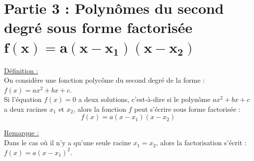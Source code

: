 \documentclass[12pt]{article}
\newcommand{\Pointilles}[2][3]{%
  \par\nobreak
  \noindent\rule{0pt}{1.5\baselineskip}%
  \multido{}{#2}{\noindent\makebox[\linewidth]{\rule{0pt}{#1\baselineskip}\dotfill}\endgraf}%
  \bigskip%
}
\begin{document}
\begin{mdframed}[
    linewidth=1pt,
    roundcorner=5pt,
    linecolor=blue
]
\begin{minipage}{.4\textwidth}
    \end{minipage}%
    \hfill
    \begin{minipage}{.6\textwidth}%
    \Pointilles[1.5]{8}
    \vspace{5pt}
    \end{minipage}%
    
\end{mdframed}

\vspace{10pt}


\section*{Partie 3 : Polynômes du second degré sous forme factorisée $\bm{f(x) = a(x-x_1)(x-x_2)}$}

\vspace{5pt}
\begin{mdframed}[
    linewidth=1pt,
    roundcorner=5pt,
    linecolor=ForestGreen
]
{\color{ForestGreen}\underline{Définition :}}
\vspace{5pt}
    \\On considère une fonction polycôme du second degré de la forme : $f(x)=ax^2+bx+c$.
    \vspace{5pt}
    \\Si l'équation $f(x) = 0$ a deux solutions, c'est-à-dire si le polynôme $ax^2+bx+c$ a deux racines $x_1$ et $x_2$, alors la fonction $f$ peut s'écrire sous forme factorisée : 
\[
    f(x) = a(x-x_1)(x-x_2)
\]
\end{mdframed}

\underline{Remarque :}
\vspace{5pt}
\\Dans le cas où il n'y a qu'une seule racine $x_1=x_2$, alors la factorisation s'écrit : $f(x) = a(x-x_1)^2$.

\vspace{10pt}
\end{document}
